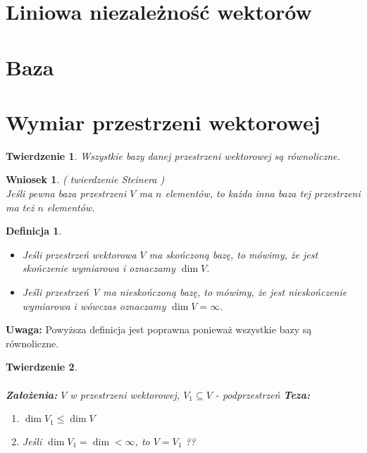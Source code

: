 \documentclass[a5paper,8pt]{article}
\newtheorem{definition}{Definicja}[section]
\newtheorem{theorem}{Twierdzenie}[section]
\newtheorem*{conclusion}{Wniosek}
\begin{document}

    \section{Liniowa niezależność wektorów} %
    \label{sec:liniowa_niezależność_wektorów}


    \section{Baza} %
    \label{sec:baza}

    \newpage
    \section{Wymiar przestrzeni wektorowej} %
    \label{sec:wymiar_przestrzeni_wektorowej}

    \begin{theorem}
        Wszystkie bazy danej przestrzeni wektorowej są równoliczne.
    \end{theorem}

    \begin{conclusion}
        ( twierdzenie Steinera ) \\
        Jeśli pewna baza przestrzeni $ V $ ma $ n $ elementów, to każda inna baza tej przestrzeni ma też $ n $ elementów.
    \end{conclusion}

    \begin{definition} \hfill
        \begin{itemize}
            \item Jeśli przestrzeń wektorowa $ V $ ma skończoną bazę, to mówimy, że jest skończenie wymiarowa i oznaczamy $ \dim V $.
            \item Jeśli przestrzeń V ma nieskończoną bazę, to mówimy, że jest nieskończenie wymiarowa i wówczas oznaczamy $ \dim V = \infty $.
        \end{itemize}
    \end{definition}

    \large{\textbf{Uwaga:}}
    Powyższa definicja jest poprawna ponieważ wszystkie bazy są równoliczne.


    \begin{theorem} \hfill \\\\
        \textbf{Założenia: } $ V $ w przestrzeni wektorowej, $ V_1 \subseteq V $ - podprzestrzeń
        \textbf{Teza: }
        \begin{enumerate}
            \item $ \dim V_1 \leq \dim V $
            \item Jeśli $ \dim V_1 = \dim < \infty $, to $ V = V_1 $ ??
        \end{enumerate}
    \end{theorem}
\end{document}
